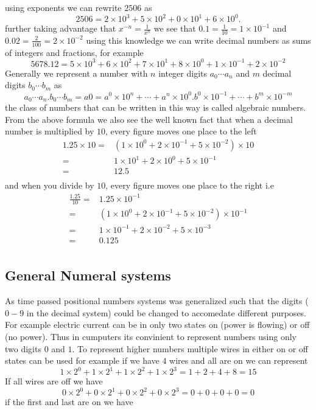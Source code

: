using exponents we can rewrite $2506$ as
\[
2506 = 2 \times 10^3 + 5 \times 10^2 + 0 \times 10^1 + 6 \times 10^0.
\]
further taking advantage that $x^{-n} = \frac{1}{x^n}$ we see that $0.1 = \frac{1}{10} = 1 \times 10^{-1}$ and $0.02 = \frac{2}{100} = 2 \times 10^{-2}$ using this knowledge we can write decimal numbers as sums of integers and fractions, for example
\[
5678.12 = 5 \times 10^3 + 6 \times 10^2 + 7 \times 10^1 + 8 \times 10^0 + 1 \times
10^{-1} + 2 \times 10^{-2}
\]
Generally we represent a number with $n$ integer digits $a_0 \cdots a_n$ and $m$ decimal digits $b_0 \cdots b_m$ as
\[
a_0 \cdots a_n.b_0 \cdots b_m = a0 = a^0 \times 10^n + \cdots + a^n \times 10^0 . b^0 \times 10^{-1} + \cdots + b^m \times 10^{-m}
\]
the class of numbers that can be written in this way is called {algebraic numbers}. From the above formula we also see the well known fact that when a decimal number is multiplied by $10$, every figure moves one place to the left
\begin{align*}
1.25 \times 10 =& (1 \times 10^0 + 2 \times 10^{-1} + 5 \times 10^{-2}) \times 10 \\
               =& 1 \times 10^1 + 2 \times 10^0 + 5 \times 10^{-1}                \\
               =& 12.5                                                            \\
\end{align*}
and when you divide by $10$, every figure moves one place to the right i.e
\begin{align*}
\frac{1.25}{10} =& 1.25 \times 10^{-1}                                                  \\
                =& (1 \times 10^0 + 2 \times 10^{-1} + 5 \times 10^{-2}) \times 10^{-1} \\
                =& 1 \times 10^{-1} + 2 \times 10^{-2} + 5 \times 10^{-3}               \\
                =& 0.125                                                                \\
\end{align*}

\subsection{General Numeral systems}
As time passed positional numbers systems was generalized such that the digits ($0-9$ in the decimal system) could be changed to accomedate different purposes. For example electric current can be in only two states on (power is flowing) or off (no power). Thus in cumputers its convinient to represent numbers using only two digits $0$ and $1$. To represent higher numbers multiple wires in either on or off states can be used for example if we have $4$ wires and all are on we can represent
\[
  1 \times 2^0 + 1 \times 2^1 + 1 \times 2^2 + 1 \times 2^3 = 1 + 2 + 4 + 8 = 15
\]
If all wires are off we have
\[
  0 \times 2^0 + 0 \times 2^1 + 0 \times 2^2 + 0 \times 2^3 = 0 + 0 + 0 + 0 = 0
\]
if the first and last are on we have


